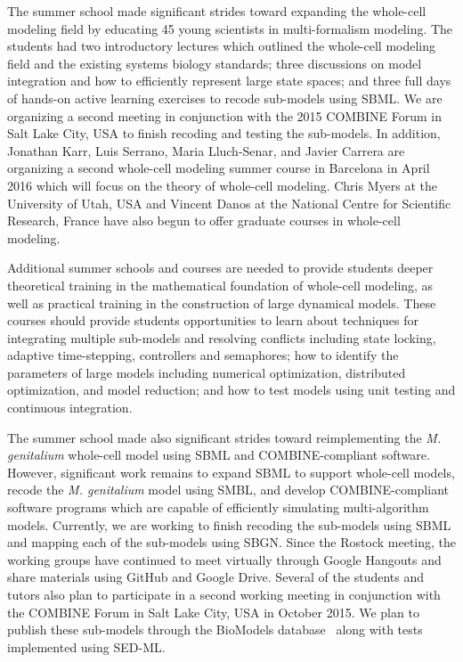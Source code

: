 \documentclass[journal,transmag]{IEEEtran}
\begin{document}
The summer school made significant strides toward expanding the whole-cell modeling field by educating 45 young scientists in multi-formalism modeling. 
The students had two introductory lectures which outlined the whole-cell modeling field and the existing systems biology standards; three discussions on model integration and how to efficiently represent large state spaces; and three full days of hands-on active learning exercises to recode sub-models using SBML. 
We are organizing a second meeting in conjunction with the 2015 COMBINE Forum in Salt Lake City, USA to finish recoding and testing the sub-models.
In addition, Jonathan Karr, Luis Serrano, Maria Lluch-Senar, and Javier Carrera are organizing a second whole-cell modeling summer course in Barcelona in April 2016 which will focus on the theory of whole-cell modeling. 
Chris Myers at the University of Utah, USA and Vincent Danos at the National Centre for Scientific Research, France have also begun to offer graduate courses in whole-cell modeling.

Additional summer schools and courses are needed to provide students deeper theoretical training in the mathematical foundation of whole-cell modeling, as well as practical training in the construction of large dynamical models. These courses should provide students opportunities to learn about techniques for integrating multiple sub-models and resolving conflicts including state locking, adaptive time-stepping, controllers and semaphores; how to identify the parameters of large models including numerical optimization, distributed optimization, and model reduction; and how to test models using unit testing and continuous integration. 

The summer school made also significant strides toward reimplementing the \textit{M. genitalium} whole-cell model using SBML and COMBINE-compliant software. However, significant work remains to expand SBML to support whole-cell models, recode the \textit{M. genitalium} model using SMBL, and develop COMBINE-compliant software programs which are capable of efficiently simulating multi-algorithm models. Currently, we are working to finish recoding the sub-models using SBML and mapping each of the sub-models using SBGN. Since the Rostock meeting, the working groups have continued to meet virtually through Google Hangouts and share materials using GitHub and Google Drive. Several of the students and tutors also plan to participate in a second working meeting in conjunction with the COMBINE Forum in Salt Lake City, USA in October 2015. We plan to publish these sub-models through the BioModels database~\cite{li2010biomodels} along with tests implemented using SED-ML. 
\end{document}

